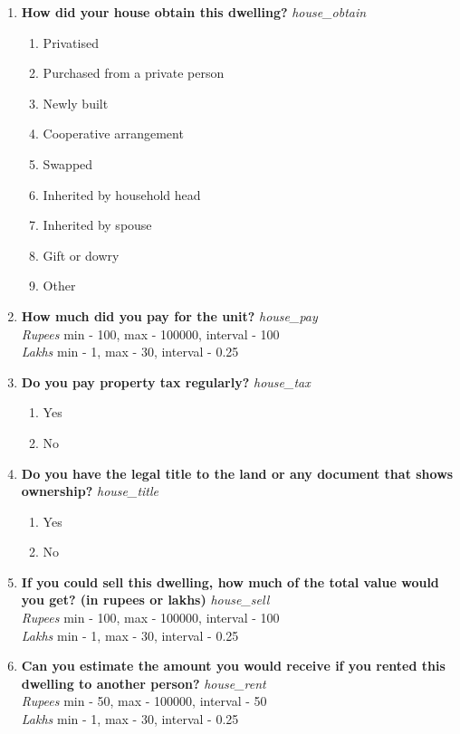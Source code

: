 \documentclass{article}
\begin{document}
\begin{enumerate}
\item {\bfseries How did your house obtain this dwelling?}\emph{ house\_obtain }
\begin{enumerate}
\item Privatised
\item Purchased from a private person
\item Newly built
\item Cooperative arrangement
\item Swapped
\item Inherited by household head
\item Inherited by spouse
\item Gift or dowry
\item Other
\end{enumerate}
\item {\bfseries How much did you pay for the unit?}\emph{ house\_pay }
\\ \emph{ Rupees }min - 100, max - 100000, interval - 100
\\ \emph{ Lakhs }min - 1, max - 30, interval - 0.25

\item {\bfseries Do you pay property tax regularly?}\emph{ house\_tax }
\begin{enumerate}
\item Yes
\item No
\end{enumerate}
\item {\bfseries Do you have the legal title to the land or any document that shows ownership?}\emph{ house\_title }
\begin{enumerate}
\item Yes
\item No
\end{enumerate}
\item {\bfseries If you could sell this dwelling, how much of the total value would you get? (in rupees or lakhs)}\emph{ house\_sell }
\\ \emph{ Rupees }min - 100, max - 100000, interval - 100
\\ \emph{ Lakhs }min - 1, max - 30, interval - 0.25

\item {\bfseries Can you estimate the amount you would receive if you rented this dwelling to another person?}\emph{ house\_rent }
\\ \emph{ Rupees }min - 50, max - 100000, interval - 50
\\ \emph{ Lakhs }min - 1, max - 30, interval - 0.25


\end{enumerate}
\end{document}
